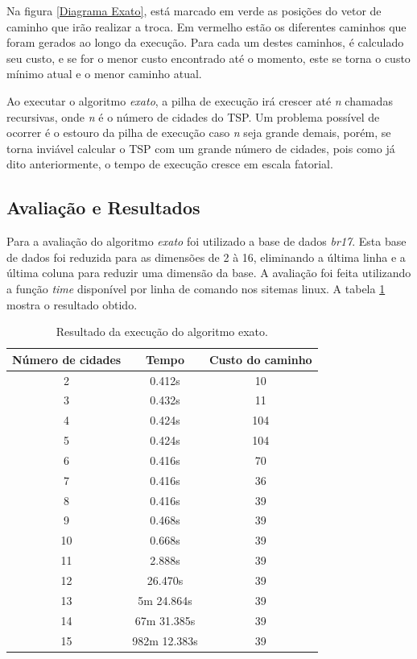 \documentclass[a4paper,12pt]{article}
\begin{document}
Na figura \ref{Diagrama Exato}, está marcado em verde as posições do vetor de caminho que irão realizar a troca. Em vermelho estão os diferentes 
caminhos que foram gerados ao longo da execução. Para cada um destes caminhos, é calculado seu custo, e se for o menor custo encontrado até o momento, 
este se torna o custo mínimo atual e o menor caminho atual.

Ao executar o algoritmo \emph{exato}, a pilha de execução irá crescer até \emph{n} chamadas recursivas, onde \emph{n} 
é o número de cidades do TSP. Um problema possível de ocorrer é o estouro da pilha de execução caso \emph{n} seja grande demais, 
porém, se torna inviável  calcular o TSP com um grande número de cidades, pois como já dito anteriormente, o tempo 
de execução cresce em escala fatorial.

\subsection{Avaliação e Resultados}
Para a avaliação do algoritmo \emph{exato} foi utilizado a base de dados \emph{br17}. Esta base 
de dados foi reduzida para as dimensões de 2 à 16, eliminando a última linha e a última coluna para reduzir uma dimensão da base. 
A avaliação foi feita utilizando a função \emph{time} disponível por linha de comando nos sitemas linux.
A tabela \ref{TabelaExato} mostra o resultado obtido.

\begin{table}[H]
\centering
\caption{Resultado da execução do algoritmo exato.} \label{TabelaExato}
\begin{tabular}{ccc}
\hline
Número de cidades & Tempo & Custo do caminho \\
\hline
2       & 0.412s    & 10      \\
3       & 0.432s        & 11      \\
4       & 0.424s     & 104     \\
5       & 0.424s     & 104     \\
6       & 0.416s      & 70      \\
7       & 0.416s      & 36      \\
8       & 0.416s      & 39      \\
9       & 0.468s      & 39      \\
10      & 0.668s      & 39      \\
11      & 2.888s      & 39      \\
12      & 26.470s      & 39      \\
13      & 5m 24.864s      & 39      \\
14      & 67m 31.385s      & 39      \\
15      & 982m 12.383s      & 39      \\
\hline
\end{tabular}
\end{table}
\end{document}
